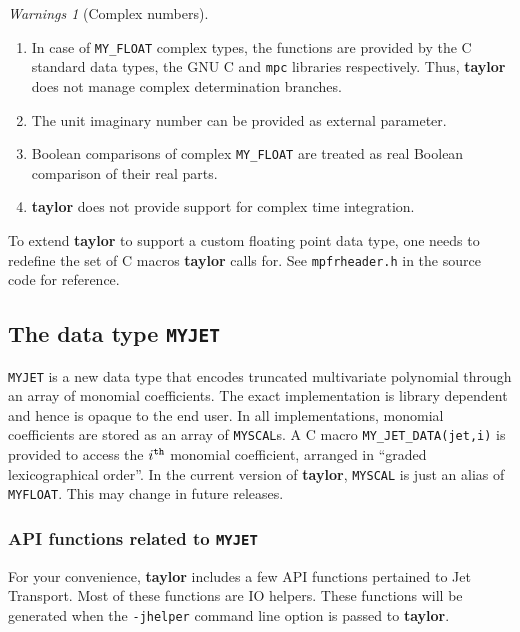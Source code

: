 \documentclass[10pt]{article}
\theoremstyle{remark}
\newtheorem*{warnings}{Warnings}
\newcommand{\taylorname}{{\bf taylor}}
\newcommand{\myfloat}{{\tt MY\symbol{95}FLOAT}}
\newcommand{\myjet}{{\tt MY\symbol{95}JET}}
\newcommand{\myscal}{{\tt MY\symbol{95}SCAL}}
\begin{document}
\begin{warnings}[Complex numbers]
 \begin{enumerate}
 \renewcommand{\theenumi}{\arabic{enumi}}
 \renewcommand{\labelenumi}{\theenumi.)}
     \item In case of \verb+MY_FLOAT+ complex types, the functions are
       provided by the C standard data types, the GNU C and \verb+mpc+
       libraries respectively. Thus, \taylorname{} does not manage
       complex determination branches.
     \item The unit imaginary number can be provided as external
       parameter.
     \item Boolean comparisons of complex \verb+MY_FLOAT+ are treated
       as real Boolean comparison of their real parts.
     \item \taylorname{} does not provide support for complex time
       integration.
 \end{enumerate}
\end{warnings}

\bigskip
To extend \taylorname{} to support a custom floating point data type,
one needs to redefine the set of C macros \taylorname{} calls for. See
{\tt{mpfrheader.h}} in the source code for reference.


\subsection{The data type \myjet{}} \label{sec:myjet}
\myjet{} is a new data type that encodes truncated multivariate
polynomial through an array of monomial coefficients. The exact
implementation is library dependent and hence is opaque to the end
user. In all implementations, monomial coefficients are stored as an
array of \myscal{}s. A C macro \verb+MY_JET_DATA(jet,i)+ is provided
to access the $i^{{\tt th}}$ monomial coefficient, arranged in
``graded lexicographical order''.  In the current version of
\taylorname{}, \myscal{} is just an alias of \myfloat{}. This may
change in future releases.

\subsubsection*{API functions related to \myjet{}} \label{sec:myjetapi}
For your convenience, \taylorname{} includes a few API functions
pertained to Jet Transport. Most of these functions are IO
helpers. These functions will be generated when the \verb+-jhelper+
command line option is passed to \taylorname{}.
\end{document}
